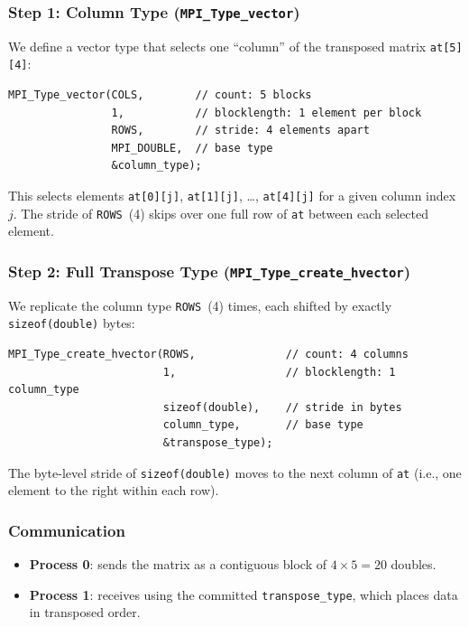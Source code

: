 \documentclass[11pt,a4paper]{article}
\begin{document}
\subsubsection{Step 1: Column Type (\texttt{MPI\_Type\_vector})}

We define a vector type that selects one ``column'' of the transposed matrix \texttt{at[5][4]}:

\begin{lstlisting}
MPI_Type_vector(COLS,        // count: 5 blocks
                1,           // blocklength: 1 element per block
                ROWS,        // stride: 4 elements apart
                MPI_DOUBLE,  // base type
                &column_type);
\end{lstlisting}

This selects elements \texttt{at[0][j]}, \texttt{at[1][j]}, \ldots, \texttt{at[4][j]} for a given column index $j$. The stride of \texttt{ROWS}~(4) skips over one full row of \texttt{at} between each selected element.

\subsubsection{Step 2: Full Transpose Type (\texttt{MPI\_Type\_create\_hvector})}

We replicate the column type \texttt{ROWS}~(4) times, each shifted by exactly \texttt{sizeof(double)} bytes:

\begin{lstlisting}
MPI_Type_create_hvector(ROWS,              // count: 4 columns
                        1,                 // blocklength: 1 column_type
                        sizeof(double),    // stride in bytes
                        column_type,       // base type
                        &transpose_type);
\end{lstlisting}

The byte-level stride of \texttt{sizeof(double)} moves to the next column of \texttt{at} (i.e., one element to the right within each row).

\subsubsection{Communication}

\begin{itemize}
    \item \textbf{Process 0}: sends the matrix as a contiguous block of $4 \times 5 = 20$ doubles.
    \item \textbf{Process 1}: receives using the committed \texttt{transpose\_type}, which places data in transposed order.
\end{itemize}
\end{document}
